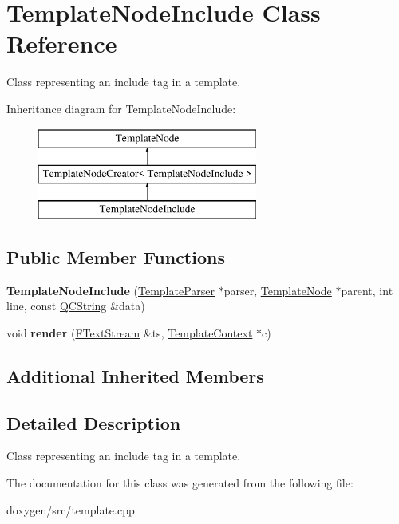 \hypertarget{class_template_node_include}{}\section{Template\+Node\+Include Class Reference}
\label{class_template_node_include}


Class representing an \textquotesingle{}include\textquotesingle{} tag in a template.  


Inheritance diagram for Template\+Node\+Include\+:\begin{figure}[H]
\begin{center}
\leavevmode
\includegraphics[height=3.000000cm]{class_template_node_include}
\end{center}
\end{figure}
\subsection*{Public Member Functions}
\begin{DoxyCompactItemize}
\item 
\mbox{\label{class_template_node_include_a7c581fbb5dd87f333ad1c716243e2d9d}} 
{\bfseries Template\+Node\+Include} (\mbox{\hyperlink{class_template_parser}{Template\+Parser}} $\ast$parser, \mbox{\hyperlink{class_template_node}{Template\+Node}} $\ast$parent, int line, const \mbox{\hyperlink{class_q_c_string}{Q\+C\+String}} \&data)
\item 
\mbox{\label{class_template_node_include_ad97559b461725ed3b3e7672eb16932c1}} 
void {\bfseries render} (\mbox{\hyperlink{class_f_text_stream}{F\+Text\+Stream}} \&ts, \mbox{\hyperlink{class_template_context}{Template\+Context}} $\ast$c)
\end{DoxyCompactItemize}
\subsection*{Additional Inherited Members}


\subsection{Detailed Description}
Class representing an \textquotesingle{}include\textquotesingle{} tag in a template. 

The documentation for this class was generated from the following file\+:\begin{DoxyCompactItemize}
\item 
doxygen/src/template.\+cpp\end{DoxyCompactItemize}
